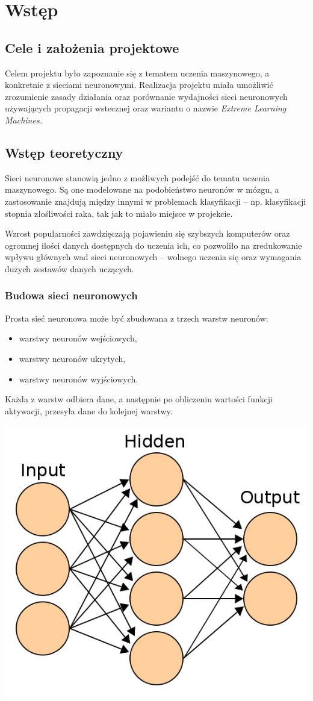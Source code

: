 \chapter{Wstęp}
\section{Cele i założenia projektowe}
Celem projektu było zapoznanie się z tematem uczenia maszynowego, a konkretnie z sieciami neuronowymi.
Realizacja projektu miała umożliwić zrozumienie zasady działania oraz porównanie wydajności sieci neuronowych używających propagacji wstecznej oraz wariantu o nazwie \textit{Extreme Learning Machines.}
\section{Wstęp teoretyczny}
Sieci neuronowe stanowią jedno z możliwych podejść do tematu uczenia maszynowego.
Są one modelowane na podobieństwo neuronów w mózgu, a zastosowanie znajdują między innymi w problemach klasyfikacji -- np. klasyfikacji stopnia złośliwości raka, tak jak to miało miejsce w projekcie.

Wzrost popularności zawdzięczają pojawieniu się szybszych komputerów oraz ogromnej ilości danych dostępnych do uczenia ich, co pozwoliło na zredukowanie wpływu głównych wad sieci neuronowych -- wolnego uczenia się oraz wymagania dużych zestawów danych uczących.
\subsection{Budowa sieci neuronowych}
Prosta sieć neuronowa może być zbudowana z trzech warstw neuronów:
\begin{itemize}
	\item{warstwy neuronów wejściowych,}
	\item{warstwy neuronów ukrytych,}
	\item{warstwy neuronów wyjściowych.}
\end{itemize}
Każda z warstw odbiera dane, a następnie po obliczeniu wartości funkcji aktywacji, przesyła dane do kolejnej warstwy.

\includegraphics[scale=0.3]{img/model.png}